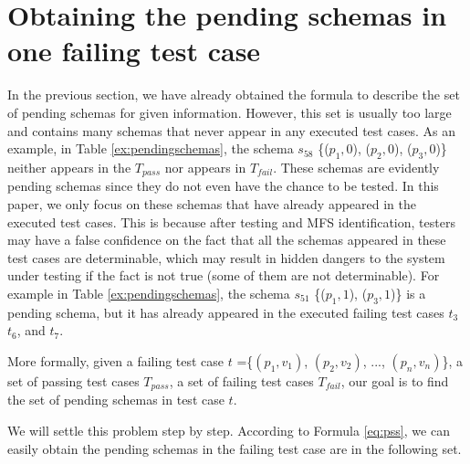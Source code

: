 
\section{Obtaining the pending schemas in one failing test case}\label{sec:pending:obtaining}

In the previous section, we have already obtained the formula to describe the set of pending schemas for given information. However, this set is usually too large and contains many schemas that never appear in any executed test cases. As an example, in Table \ref{ex:pendingschemas}, the schema $s_{58}$ \{($p_{1}, 0$), ($p_{2}, 0$), ($p_{3}, 0$)\} neither appears in the $T_{pass}$ nor appears in $T_{fail}$. These schemas are evidently pending schemas since they do not even have the chance to be tested. In this paper, we only focus on these schemas that have already appeared in the executed test cases. This is because after testing and MFS identification, testers may have a false confidence on the fact that all the schemas appeared in these test cases are determinable, which may result in hidden dangers to the system under testing if the fact is not true (some of them are not determinable). For example in Table \ref{ex:pendingschemas}, the schema $s_{51}$  \{($p_{1}, 1$), ($p_{3}, 1$)\} is a pending schema, but it has already appeared in the executed failing test cases $t_{3}$ $t_{6}$, and $t_{7}$.


More formally,  given a failing test case $t$ =\{$(p_{1}, v_{1})$, $(p_{2}, v_{2})$, ..., $(p_{n}, v_{n})$\},  a set of passing test cases $T_{pass}$, a set of failing test cases $T_{fail}$, our goal is to find the set of pending schemas in test case $t$.


We will settle this problem step by step.  According to Formula \ref{eq:pss}, we can easily obtain the pending schemas in the failing test case are in the following set.


